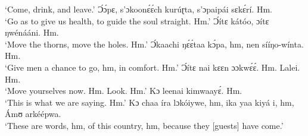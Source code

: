 \documentclass[output=paper,colorlinks,citecolor=brown]{langscibook}
\begin{document}
            `Come, drink, and leave.'
    \ex     Ɔ́ɔ́pɛ, s’ɔkoonɛ́ɛ́ch kurúɽta, s’ɔpaipái sɛkɛ́rí. Hm.\\
            `Go as to give us health, to guide the soul straight. Hm.'
    \ex     Ɔ́ítɛ kátóo, ɔítɛ ŋwénááni. Hm.\\
            `Move the thorns, move the holes. Hm.'
    \ex     Ɔ́kaachi ŋɛ́ɛ́taa kɔ́pa, hm, nen sííŋo-wínta. Hm.\\
            `Give men a chance to go, hm, in comfort. Hm.'
    \ex     Ɔ́ítɛ nai kɛɛn ɔɔkwɛ́ɛ́. Hm. Lalei. Hm.\\
            `Move yourselves now. Hm. Look. Hm.'
    \ex     Kɔ leenai kimwaayɛ́. Hm.\\
            `This is what we are saying. Hm.'
    \ex     Kɔ chaa íra lɔkóiywe, hm, ika yaa kiyá i, hm, Ámʊ arkéépwa.\\
            `These are words, hm, of this country, hm, because they [guests] have come.'
    \z


 
\end{document}
